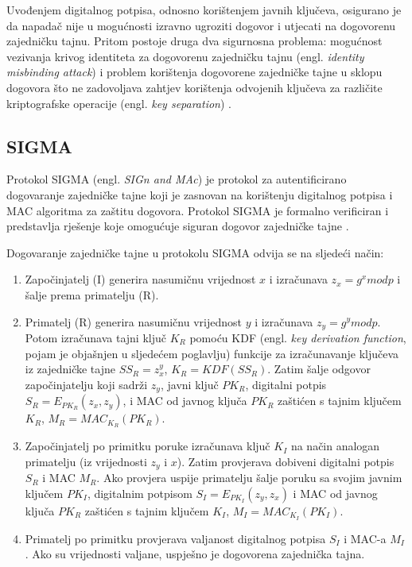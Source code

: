 Uvođenjem digitalnog potpisa, odnosno korištenjem javnih ključeva, osigurano je
da napadač nije u
mogućnosti izravno ugroziti dogovor i utjecati na dogovorenu zajedničku tajnu.
Pritom postoje druga dva sigurnosna problema: mogućnost vezivanja krivog
identiteta za dogovorenu zajedničku tajnu (engl. \emph{identity misbinding
attack}) i problem korištenja dogovorene zajedničke tajne u sklopu dogovora što
ne zadovoljava zahtjev korištenja odvojenih ključeva za različite kriptografske
operacije (engl. \emph{key separation}) \cite{Krawczyk2003sigma}.

\subsection{SIGMA}
\label{sec:sigma}


Protokol SIGMA (engl. \emph{SIGn and MAc}) je protokol za autentificirano
dogovaranje zajedničke tajne koji je zasnovan na korištenju digitalnog potpisa i
MAC algoritma za zaštitu dogovora. Protokol SIGMA je formalno verificiran i
predstavlja rješenje koje omogućuje siguran dogovor zajedničke tajne
\cite{Krawczyk2003sigma}.

Dogovaranje zajedničke tajne u protokolu SIGMA odvija se na sljedeći
način:
\begin{enumerate}
\item Započinjatelj (I) generira nasumičnu vrijednost $x$ i izračunava $z_x=g^x
    mod p$ i šalje prema primatelju (R).
\item Primatelj (R) generira nasumičnu vrijednost $y$ i izračunava $z_y=g^y mod
    p$. Potom izračunava tajni ključ $K_R$ pomoću KDF (engl. \emph{key
    derivation function}, pojam je objašnjen u sljedećem poglavlju) funkcije za
    izračunavanje ključeva iz zajedničke tajne $SS_R=z_x^{y}$, $K_R=KDF(SS_R)$.
    Zatim šalje odgovor započinjatelju koji sadrži $z_y$, javni ključ $PK_R$,
    digitalni potpis $S_R=E_{PK_R}(z_x, z_y)$, i MAC od javnog ključa $PK_R$
    zaštićen s tajnim ključem $K_R$, $M_R=MAC_{K_R}(PK_R)$.
\item Započinjatelj po primitku poruke izračunava ključ $K_I$ na način analogan
    primatelju (iz vrijednosti $z_y$ i $x$). Zatim provjerava dobiveni digitalni
    potpis $S_R$ i MAC $M_R$. Ako provjera uspije primatelju šalje poruku sa
    svojim javnim ključem $PK_I$, digitalnim potpisom $S_I=E_{PK_I}(z_y, z_x)$ i
    MAC od javnog ključa $PK_R$ zaštićen s tajnim ključem $K_I$, 
    $M_I=MAC_{K_I}(PK_I)$.
\item Primatelj po primitku provjerava valjanost digitalnog potpisa $S_I$ i
    MAC-a $M_I$. Ako su vrijednosti valjane, uspješno je dogovorena
    zajednička tajna.
\end{enumerate}

